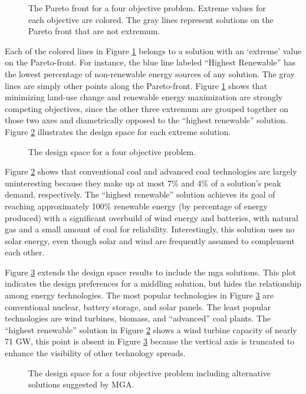\begin{figure}[h]
  \centering
  \resizebox{\columnwidth}{!}{}
  \caption{The Pareto front for a four objective problem. Extreme values for
  each objective are colored. The gray lines represent solutions on the Pareto
  front that are not extremum.}
  \label{fig:4-obj-pareto}
\end{figure}

Each of the colored lines in Figure \ref{fig:4-obj-pareto} belongs to a solution
with an `extreme' value on the Pareto-front. For instance, the blue line labeled
``Highest Renewable'' has the lowest percentage of non-renewable energy sources
of any solution. The gray lines are simply other points along the Pareto-front.
Figure \ref{fig:4-obj-pareto} shows that minimizing land-use change and
renewable energy maximization are strongly competing objectives, since the other
three extremum are grouped together on those two axes and diametrically opposed
to the ``highest renewable'' solution. Figure \ref{fig:4-obj-design} illustrates
the design space for each extreme solution. 


\begin{figure}[h]
  \centering
  \resizebox{\columnwidth}{!}{}
  \caption{The design space for a four objective problem.}
  \label{fig:4-obj-design}
\end{figure}

Figure \ref{fig:4-obj-design} shows that conventional coal and advanced coal
technologies are largely uninteresting because they make up at most 7\% and 4\%
of a solution's peak demand, respectively. The ``highest renewable'' solution
achieves its goal of reaching approximately 100\% renewable energy (by
percentage of energy produced) with a significant overbuild of wind energy and
batteries, with natural gas and a small amount of coal for reliability.
Interestingly, this solution uses no solar energy, even though solar and wind
are frequently assumed to complement each other.

Figure \ref{fig:4-obj-design-mga} extends the design space results to include
the \ac{mga} solutions. This plot indicates the design preferences for a
middling solution, but hides the relationship among energy technologies. The
most popular technologies in Figure \ref{fig:4-obj-design-mga} are conventional
nuclear, battery storage, and solar panels. The least popular technologies are
wind turbines, biomass, and ``advanced'' coal plants. The ``highest renewable'' 
solution in Figure \ref{fig:4-obj-design} shows a wind turbine capacity of nearly 71
GW, this point is absent in Figure \ref{fig:4-obj-design-mga} because the vertical
axis is truncated to enhance the visibility of other technology spreads.

\begin{figure}[h]
  \centering
  \resizebox{\columnwidth}{!}{}
  \caption{The design space for a four objective problem including alternative solutions suggested by MGA.}
  \label{fig:4-obj-design-mga}
\end{figure}